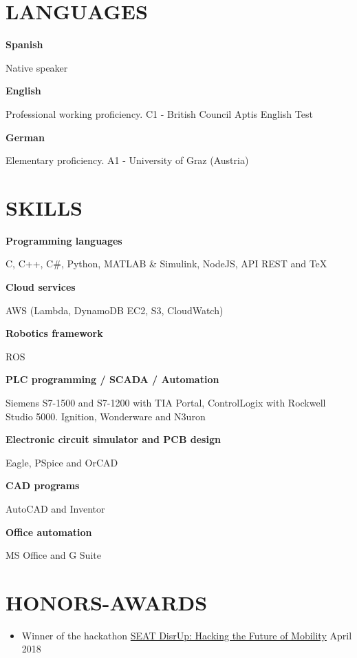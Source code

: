 \documentclass[10pt,a4paper,oneside]{book}
\newcommand{\sepspace}{\vspace*{0pt}}		%
\newcommand{\NewPart}[2]{\section*{\uppercase{#1} #2}}
\newcommand{\EducationEntrya}[4]{\noindent\ignorespaces	
		\begin{minipage}[t][][b]{0.8\textwidth} \raggedright{\textbf{#1}} \end{minipage} \hfill 
		\begin{minipage}[t][][b]{0.2\textwidth} \hfill\color{Black}#2\end{minipage} 
		 
		\noindent \textit{#3} \par        %
		\noindent\hangindent=2em\hangafter=0 \small #4 
		\normalsize \par}
\newcommand{\LanguageEntry}[2]{\noindent\ignorespaces
\textbf{#1}	\par
\noindent \small #2 \par
}
\newcommand{\ITSkillEntry}[2]{\noindent\ignorespaces
\textbf{#1}	\par
\noindent \small #2 \par
}
\begin{document}
\sepspace


\NewPart{Languages}{}
\LanguageEntry{Spanish}{Native speaker}
\sepspace
\LanguageEntry{English}{Professional working proficiency. C1 - British Council Aptis English Test}
\sepspace
\LanguageEntry{German}{Elementary proficiency. A1 - University of Graz (Austria)}

\NewPart{Skills}{}
\ITSkillEntry{Programming languages}{C,  C++, C\#, Python, MATLAB \& Simulink, NodeJS, API REST and \TeX}
\ITSkillEntry{Cloud services}{AWS (Lambda, DynamoDB EC2, S3, CloudWatch)}
\ITSkillEntry{Robotics framework}{ROS}
\sepspace
\ITSkillEntry{PLC programming / SCADA / Automation}{Siemens S7-1500 and S7-1200 with TIA Portal, ControlLogix with Rockwell Studio 5000. Ignition, Wonderware and N3uron}
\sepspace
\ITSkillEntry{Electronic circuit simulator and PCB design}{Eagle, PSpice and OrCAD}
\sepspace
\ITSkillEntry{CAD programs}{AutoCAD and Inventor}
\sepspace
\ITSkillEntry{Office automation}{MS Office and G Suite}


\NewPart{Honors-Awards}{}
\begin{itemize}
    \item Winner of the hackathon \href{https://www.seatdisrup.com/}{SEAT DisrUp: Hacking the Future of Mobility} \hfill April 2018
\end{itemize}
\end{document}
